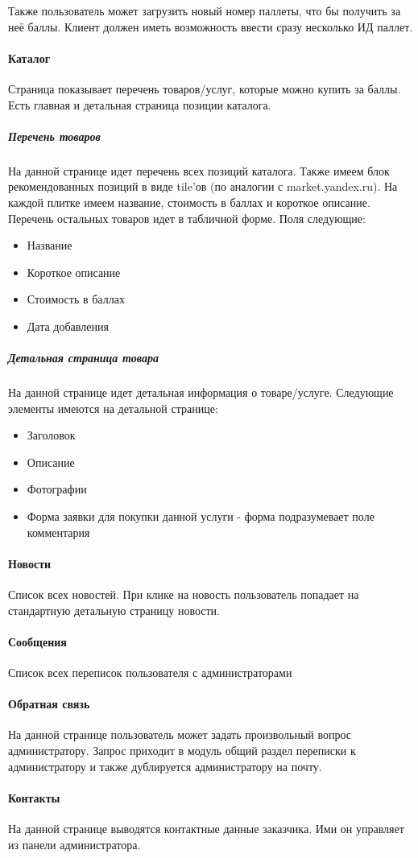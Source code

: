 \documentclass[DIV=calc, paper=a4, fontsize=11pt]{scrartcl} %
\begin{document}
Также пользователь может загрузить новый номер паллеты, что бы получить за неё баллы. Клиент должен иметь возможность ввести сразу несколько ИД паллет.

\paragraph{Каталог}

Страница показывает перечень товаров/услуг, которые можно купить за баллы. Есть главная и детальная страница позиции каталога.

\subparagraph{Перечень товаров}
На данной странице идет перечень всех позиций каталога.
Также имеем блок рекомендованных позиций в виде tile'ов (по аналогии с market.yandex.ru). На каждой плитке имеем название, стоимость в баллах и короткое описание.
\\[0.5cm]
Перечень остальных товаров идет в табличной форме. Поля следующие:

\begin{itemize}
	\item Название
	\item Короткое описание
	\item Стоимость в баллах
	\item Дата добавления
\end{itemize}

\subparagraph{Детальная страница товара}
На данной странице идет детальная информация о товаре/услуге. Следующие элементы имеются на детальной странице:

\begin{itemize}
	\item Заголовок
	\item Описание
	\item Фотографии
	\item Форма заявки для покупки данной услуги - форма подразумевает поле комментария
\end{itemize}

\paragraph{Новости}
Список всех новостей. При клике на новость пользователь попадает на стандартную детальную страницу новости.

\paragraph{Сообщения}
Список всех переписок пользователя с администраторами

\paragraph{Обратная связь}
На данной странице пользователь может задать произвольный вопрос администратору. Запрос приходит в модуль общий раздел переписки к администратору и также дублируется администратору на почту.

\paragraph{Контакты}
На данной странице выводятся контактные данные заказчика. Ими он управляет из панели администратора.
\end{document}
